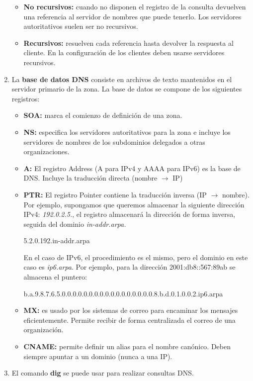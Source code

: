 \begin{enumerate}
\begin{itemize}
        \item \textbf{No recursivos: }cuando no disponen el registro de la consulta devuelven una referencia al servidor de nombres que puede tenerlo. Los servidores autoritativos suelen ser no recursivos.
        \item \textbf{Recursivos: }resuelven cada referencia hasta devolver la respuesta al cliente. En la configuración de los clientes deben usarse servidores recursivos.
    \end{itemize}
    \item La \textbf{base de datos DNS} consiste en archivos de texto  mantenidos en el servidor primario de la zona. La base de datos se compone de los siguientes registros:
    \begin{itemize}
        \item \textbf{SOA: }marca el comienzo de definición de una zona.
        \item \textbf{NS: }especifica los servidores autoritativos para la zona e incluye los servidores de nombres de los subdominios delegados a otras organizaciones.
        \item \textbf{A: }El registro Address (A para IPv4 y AAAA para IPv6) es la base de DNS. Incluye la traducción directa (nombre $\rightarrow$ IP)
        \item \textbf{PTR: }El registro Pointer contiene la traducción inversa (IP $\rightarrow$ nombre). Por ejemplo, supongamos que queremos almacenar la siguiente dirección IPv4: \textit{192.0.2.5.}, el registro almacenará la dirección de forma inversa, seguida del dominio \textit{in-addr.arpa.}
        \begin{center}
            5.2.0.192.in-addr.arpa
        \end{center}
        En el caso de IPv6, el procedimiento es el mismo, pero el dominio en este caso es \textit{ip6.arpa}. Por ejemplo, para la dirección 2001:db8::567:89ab se almacena el puntero:
        \begin{center}
            b.a.9.8.7.6.5.0.0.0.0.0.0.0.0.0.0.0.0.0.0.0.0.0.8.b.d.0.1.0.0.2.ip6.arpa
        \end{center}
        \item \textbf{MX: }es usado por los sistemas de correo para encaminar los mensajes eficientemente. Permite recibir de forma centralizada el correo de una organización.
        \item \textbf{CNAME: } permite definir un alias para el nombre canónico. Deben siempre apuntar a un dominio (nunca a una IP).
    \end{itemize}
    \item El comando \textbf{dig} se puede usar para realizar consultas DNS.
\end{enumerate}
